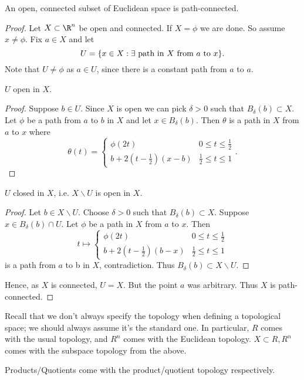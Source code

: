 \begin{proposition}                       %
An open, connected subset of Euclidean space is path-connected.
\end{proposition}
\begin{proof}
Let $X\subset \R^n$ be open and connected. If $X = \phi$ we are done. So assume $x\neq \phi$. Fix $a\in X$ and let \[ U = \{x\in X : \exists \textup{ path in } X \textup{ from } a \textup{ to } x\}. \]
Note that $U\neq \phi$ as $a\in U$, since  there is a constant path from $a$ to $a$.

\begin{claim}
    $U$ open in $X$.
\end{claim} 
\begin{proof}
Suppose $b\in U$. Since $X$ is open we can pick $\delta > 0$ such that $B_\delta(b) \subset X$. Let $\phi$ be a path from $a$ to $b$ in $X$ and let $x\in B_\delta(b)$. Then $\theta$ is a path in $X$ from $a$ to $x$ where 
\[
\theta(t) = \begin{cases}
\phi(2t) & 0\leq t \leq \frac{1}{2}\\
b + 2(t-\frac{1}{2})(x-b) & \frac{1}{2}\leq t \leq 1
\end{cases}.
\]
\end{proof}

\begin{claim}
    $U$ closed in $X$, i.e. $X\backslash U$ is open in $X$.
\end{claim} 

\begin{proof}
Let $b \in X\backslash U$. Choose $\delta> 0$ such that $B_\delta(b) \subset X.$ Suppose $x\in B_\delta (b)\cap U$. Let $\phi$ be a path in $X$ from $a$ to $x$. Then 
\[
t \mapsto \begin{cases}
\phi(2t) & 0\leq t \leq \frac{1}{2}\\
b + 2(t-\frac{1}{2})(b-x) & \frac{1}{2}\leq t \leq 1
\end{cases}
\]
is a path from $a$ to b in $X$, contradiction. Thus $B_\delta (b) \subset X\backslash U$.
\end{proof}
Hence, as $X$ is connected, $U=X$. But the point $a$ was arbitrary. Thus $X$ is path-connected.
\end{proof}

\begin{remark}
Recall that we don't always specify the topology when defining a topological space; we should always assume it's the standard one. In particular, $R$ comes with the usual topology, and $R^n$ comes with the Euclidean topology. $X\subset R,R^n$ comes with the subspace topology from the above.

Products/Quotients come with the product/quotient topology respectively.
\end{remark}

